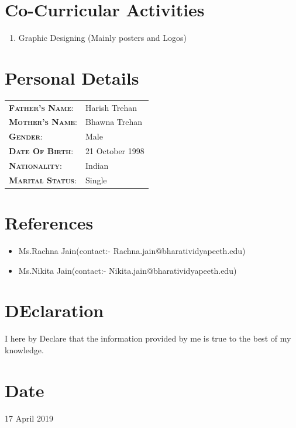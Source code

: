 \documentclass{my_cv}
\begin{document}
	\section{\colorbox{mycolor}{\textcolor{golde}{Co-Curricular Activities}}}
		\begin{enumerate}
			\item Graphic Designing (Mainly posters and Logos)
		\end{enumerate}
	
	
    \section{\colorbox{mycolor}{\textcolor{golde}{
    Personal Details}}}
 
 	\begin{tabular}{ll}
    	\textsc{\textbf{Father's Name}:} & Harish Trehan \\
    	\textsc{\textbf{Mother's Name}:}       & Bhawna Trehan \\
    	\textsc{\textbf{Gender}:}         & Male \\
    	\textsc{\textbf{Date Of Birth}:}         & 21 October 1998 \\
    	\textsc{\textbf{Nationality}:}   & Indian \\
    	\textsc{\textbf{Marital Status}:} & Single \\
    \end{tabular}
	\section{\colorbox{mycolor}{\textcolor{golde}{References}}}
		\begin{itemize}
			\item Ms.Rachna Jain(contact:- Rachna.jain@bharatividyapeeth.edu)
			\item Ms.Nikita Jain(contact:- Nikita.jain@bharatividyapeeth.edu)
		\end{itemize}
	\section{\colorbox{mycolor}{\textcolor{golde}{DEclaration}}}
	I here by Declare that the information provided by me is true to the best of my knowledge.
	\section{\colorbox{mycolor}{\textcolor{golde}{Date}}}
	17 April 2019
	
\end{document}

